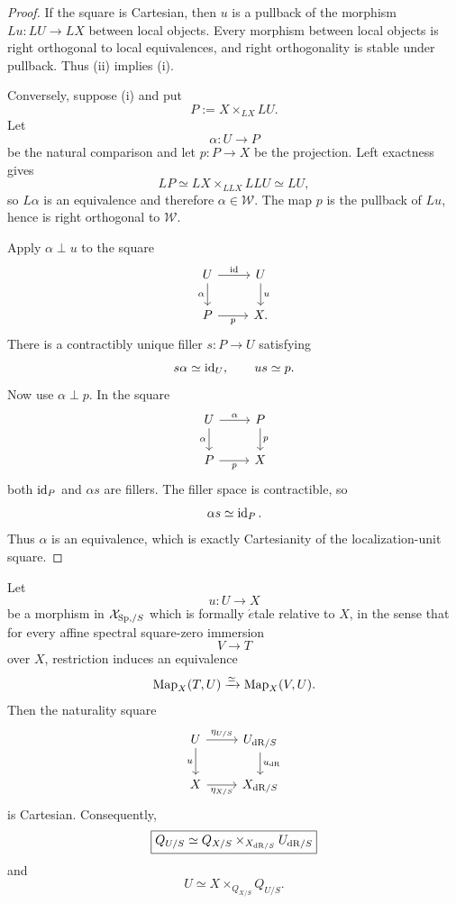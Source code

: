 \begin{proof}
If the square is Cartesian, then \(u\) is a pullback of the morphism \(Lu:LU\to LX\) between
local objects.  Every morphism between local objects is right orthogonal to local equivalences, and
right orthogonality is stable under pullback.  Thus (ii) implies (i).

Conversely, suppose (i) and put
\[
    P:=X\times_{LX}LU.
\]
Let
\[
    \alpha:U\longrightarrow P
\]
be the natural comparison and let \(p:P\to X\) be the projection.  Left exactness gives
\[
    LP
    \simeq
    LX\times_{LLX}LLU
    \simeq
    LU,
\]
so \(L\alpha\) is an equivalence and therefore \(\alpha\in\mathcal W\).  The map \(p\) is the
pullback of \(Lu\), hence is right orthogonal to \(\mathcal W\).

Apply \(\alpha\perp u\) to the square
\[
\begin{tikzcd}
    U \ar[r,"\id"] \ar[d,"\alpha"']
        & U \ar[d,"u"]\\
    P \ar[r,"p"']
        & X.
\end{tikzcd}
\]
There is a contractibly unique filler \(s:P\to U\) satisfying
\[
    s\alpha\simeq\operatorname{id}_U,
    \qquad
    us\simeq p.
\]
Now use \(\alpha\perp p\).  In the square
\[
\begin{tikzcd}
    U \ar[r,"\alpha"] \ar[d,"\alpha"']
        & P \ar[d,"p"]\\
    P \ar[r,"p"']
        & X
\end{tikzcd}
\]
both \(\operatorname{id}_P\) and \(\alpha s\) are fillers.  The filler space is contractible, so
\[
    \alpha s\simeq\operatorname{id}_P.
\]
Thus \(\alpha\) is an equivalence, which is exactly Cartesianity of the localization-unit square.
\end{proof}

\begin{proposition}
\label{prop:formal-etale-de-rham-cartesianity}
Let
\[
    u:U\longrightarrow X
\]
be a morphism in \(\mathcal X_{\mathrm{Sp},/S}\) which is formally
\(\acute{e}\)tale relative to \(X\), in the sense that for every affine spectral
square-zero immersion
\[
    V\longrightarrow T
\]
over \(X\), restriction induces an equivalence
\[
    \operatorname{Map}_X(T,U)
    \xrightarrow{\simeq}
    \operatorname{Map}_X(V,U).
\]
Then the naturality square
\[
\begin{tikzcd}
    U \ar[r,"\eta_{U/S}"] \ar[d,"u"']
    & U_{\dR/S} \ar[d,"u_{\dR}"]
    \\
    X \ar[r,"\eta_{X/S}"']
    & X_{\dR/S}
\end{tikzcd}
\]
is Cartesian.  Consequently,
\[
\boxed{
    Q_{U/S}
    \simeq
    Q_{X/S}\times_{X_{\mathrm{dR}/S}}U_{\mathrm{dR}/S}
}
\]
and
\[
\boxed{
    U
    \simeq
    X\times_{Q_{X/S}}Q_{U/S}.
}
\]
\end{proposition}

